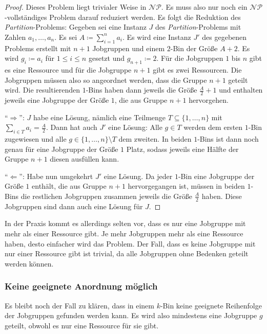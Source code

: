\documentclass{scrreprt}
\begin{document}
\begin{proof}
    Dieses Problem liegt trivialer Weise in $\mathcal{NP}$.
    Es muss also nur noch ein $\mathcal{NP}$-vollständiges Problem darauf reduziert werden.
    Es folgt die Reduktion des \textit{Partition}-Problems:
    Gegeben sei eine Instanz $J$ des \textit{Partition}-Problems mit Zahlen $a_1,\ldots,a_n$.
    Es sei $A\coloneqq\sum_{i=1}^{n}a_i$.
    Es wird eine Instanz $J'$ des gegebenen Problems erstellt mit $n+1$ Jobgruppen und einem $2$-Bin der Größe $A+2$.
    Es wird $g_i \coloneqq a_i$ für $1\leq i\leq n$ gesetzt und $g_{n+1}\coloneqq 2$.
    Für die Jobgruppen $1$ bis $n$ gibt es eine Ressource und für die Jobgruppe $n+1$ gibt es zwei Ressourcen.
    Die Jobgruppen müssen also so angeordnet werden, dass die Gruppe $n+1$ geteilt wird.
    Die resultierenden $1$-Bins haben dann jeweils die Größe $\frac{A}{2}+1$ und enthalten jeweils eine Jobgruppe der Größe $1$, die aus Gruppe $n+1$ hervorgehen.

    "`$\Rightarrow$"': $J$ habe eine Lösung, nämlich eine Teilmenge $T\subseteq\{1,\ldots,n\}$ mit $\sum_{i\in T}a_i = \frac{A}{2}$.
    Dann hat auch $J'$ eine Lösung: Alle $g\in T$ werden dem ersten $1$-Bin zugewiesen und alle $g\in\{1,\ldots,n\}\setminus T$ dem zweiten.
    In beiden $1$-Bins ist dann noch genau für eine Jobgruppe der Größe $1$ Platz, sodass jeweils eine Hälfte der Gruppe $n+1$ diesen ausfüllen kann.

    "`$\Leftarrow$"': Habe nun umgekehrt $J'$ eine Lösung. Da jeder $1$-Bin eine Jobgruppe der Größe $1$ enthält, die aus Gruppe $n+1$ hervorgegangen ist,
    müssen in beiden $1$-Bins die restlichen Jobgruppen zusammen jeweils die Größe $\frac{A}{2}$ haben.
    Diese Jobgruppen sind dann auch eine Lösung für $J$.
\end{proof}

In der Praxis kommt es allerdings selten vor, dass es nur eine Jobgruppe mit mehr als einer Ressource gibt.
Je mehr Jobgruppen mehr als eine Ressource haben, desto einfacher wird das Problem.
Der Fall, dass es keine Jobgruppe mit nur einer Ressource gibt ist trivial, da alle Jobgruppen ohne Bedenken geteilt werden können.

\subsubsection{Keine geeignete Anordnung möglich}
Es bleibt noch der Fall zu klären, dass in einem $k$-Bin keine geeignete Reihenfolge der Jobgruppen gefunden werden kann.
Es wird also mindestens eine Jobgruppe $g$ geteilt, obwohl es nur eine Ressource für sie gibt.
\end{document}
